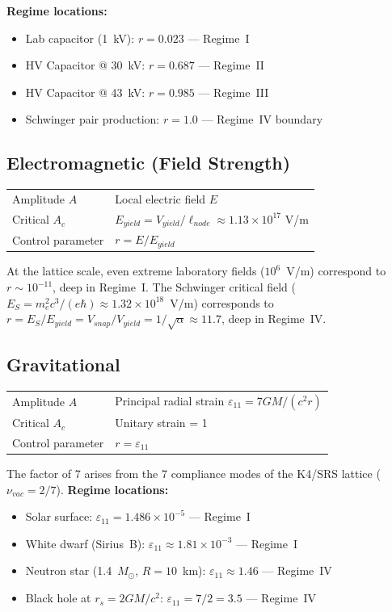 \noindent \textbf{Regime locations:}
\begin{itemize}
    \item Lab capacitor (1~kV): $r = 0.023$ --- Regime~I
    \item HV Capacitor @ 30~kV: $r = 0.687$ --- Regime~II
    \item HV Capacitor @ 43~kV: $r = 0.985$ --- Regime~III
    \item Schwinger pair production: $r = 1.0$ --- Regime~IV boundary
\end{itemize}

\subsection{Electromagnetic (Field Strength)}

\begin{center}
\begin{tabular}{ll}
\toprule
Amplitude $A$ & Local electric field $E$ \\
Critical $A_c$ & $E_{yield} = V_{yield}/\ell_{node} \approx 1.13 \times 10^{17}$ V/m \\
Control parameter & $r = E / E_{yield}$ \\
\bottomrule
\end{tabular}
\end{center}

\noindent At the lattice scale, even extreme laboratory fields ($10^6$~V/m) correspond to $r \sim 10^{-11}$, deep in Regime~I. The Schwinger critical field ($E_S = m_e^2 c^3/(e\hbar) \approx 1.32 \times 10^{18}$~V/m) corresponds to $r = E_S/E_{yield} = V_{snap}/V_{yield} = 1/\sqrt{\alpha} \approx 11.7$, deep in Regime~IV.

\subsection{Gravitational}

\begin{center}
\begin{tabular}{ll}
\toprule
Amplitude $A$ & Principal radial strain $\varepsilon_{11} = 7GM/(c^2 r)$ \\
Critical $A_c$ & Unitary strain = 1 \\
Control parameter & $r = \varepsilon_{11}$ \\
\bottomrule
\end{tabular}
\end{center}

\noindent The factor of 7 arises from the 7 compliance modes of the K4/SRS lattice ($\nu_{vac} = 2/7$). \textbf{Regime locations:}
\begin{itemize}
    \item Solar surface: $\varepsilon_{11} = 1.486 \times 10^{-5}$ --- Regime~I
    \item White dwarf (Sirius~B): $\varepsilon_{11} \approx 1.81 \times 10^{-3}$ --- Regime~I
    \item Neutron star (1.4~$M_\odot$, $R = 10$~km): $\varepsilon_{11} \approx 1.46$ --- Regime~IV
    \item Black hole at $r_s = 2GM/c^2$: $\varepsilon_{11} = 7/2 = 3.5$ --- Regime~IV
\end{itemize}

